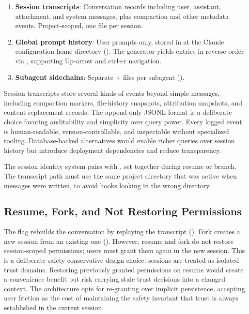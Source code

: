\begin{enumerate}[nosep]
  \item \textbf{Session transcripts}: Conversation records including user, assistant, attachment, and system messages, plus compaction and other metadata events. Project-scoped, one file per session.
  \item \textbf{Global prompt history}: User prompts only, stored in  at the Claude configuration home directory (). The  generator yields entries in reverse order via , supporting Up-arrow and ctrl+r navigation.
  \item \textbf{Subagent sidechains}: Separate  +  files per subagent ().
\end{enumerate}

Session transcripts store several kinds of events beyond simple messages, including compaction markers, file-history snapshots, attribution snapshots, and content-replacement records.
The append-only JSONL format is a deliberate choice favoring auditability and simplicity over query power. Every logged event is human-readable, version-controllable, and inspectable without specialized tooling. Database-backed alternatives would enable richer queries over session history but introduce deployment dependencies and reduce transparency.

The session identity system pairs  with , set together during resume or branch. The transcript path must use the same project directory that was active when messages were written, to avoid hooks looking in the wrong directory.

\subsection{Resume, Fork, and Not Restoring Permissions}
\label{sec:persist:recovery}

The  flag rebuilds the conversation by replaying the transcript (). Fork creates a new session from an existing one (). However, resume and fork do not restore session-scoped permissions; users must grant them again in the new session. This is a deliberate safety-conservative design choice: sessions are treated as isolated trust domains. Restoring previously granted permissions on resume would create a convenience benefit but risk carrying stale trust decisions into a changed context. The architecture opts for re-granting over implicit persistence, accepting user friction as the cost of maintaining the safety invariant that trust is always established in the current session.

